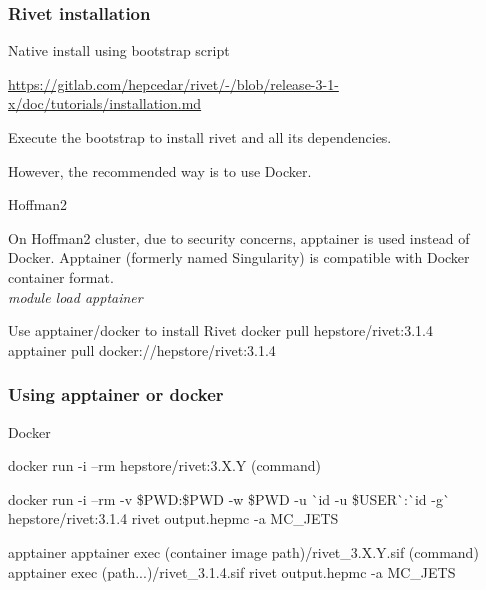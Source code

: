 \documentclass{beamer}
\begin{document}
\begin{frame}
 \frametitle{Rivet installation}
 \begin{block}{Native install using bootstrap script}
 	\begin{scriptsize}
 	\url{https://gitlab.com/hepcedar/rivet/-/blob/release-3-1-x/doc/tutorials/installation.md}  \\
 \end{scriptsize}
 	Execute the bootstrap to install rivet and all its dependencies.
 \end{block}
However, the recommended way is to use Docker.

\begin{alertblock}{Hoffman2} 
	\begin{small}
	On Hoffman2 cluster, due to security concerns, apptainer is used instead of Docker.
	Apptainer (formerly named Singularity) is compatible with Docker container format.\\
	\emph{module load apptainer}
	\end{small}
\end{alertblock}

\begin{exampleblock}{Use apptainer/docker to install Rivet}
	   docker pull hepstore/rivet:3.1.4 \\
	   apptainer pull docker://hepstore/rivet:3.1.4
\end{exampleblock}

\end{frame}



\begin{frame}
 \frametitle{Using apptainer or docker}
 \begin{block}{Docker}
 
   	docker run -i --rm hepstore/rivet:3.X.Y (command)
   	
   	docker run -i  --rm  -v \$PWD:\$PWD -w \$PWD -u \`{}id -u \$USER\`{}:\`{}id -g\`{} hepstore/rivet:3.1.4 rivet output.hepmc -a MC\_JETS

 \end{block}

\begin{exampleblock}{apptainer}
	apptainer exec (container image path)/rivet\_3.X.Y.sif (command)
	apptainer exec (path...)/rivet\_3.1.4.sif rivet output.hepmc -a MC\_JETS
\end{exampleblock}

\end{frame}
\end{document}
